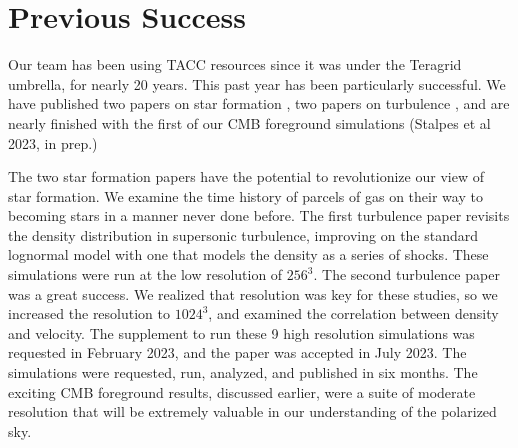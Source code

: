 \section{Previous Success}
\label{sec.previous}

Our team has been using TACC resources since it was under the Teragrid umbrella,
for nearly 20 years.
This past year has been particularly successful.  We have published two papers
on star formation \citep{Collins23, Collins23b}, two papers on turbulence
\citep{Rabatin23, Rabatin23b}, and are nearly finished with the first
of our CMB foreground simulations (Stalpes et al 2023, in prep.)

The two star formation papers have the potential to revolutionize our view of
star formation. We examine the time history of parcels of gas on their way to
becoming stars in a manner never done before.  The first turbulence paper
revisits the density distribution in supersonic turbulence, improving on the
standard lognormal model with one that models the density as a series of shocks.
These simulations were run at the low resolution of $256^3$.
The second turbulence paper was a great success.  We realized that resolution
was key for these studies, so we increased the resolution to $1024^3$, and
examined the correlation between density and velocity.  The supplement to run
these 9 high resolution simulations was requested in February 2023, and the
paper was accepted in July 2023.  The simulations were requested, run, analyzed, and
published in six months.  The exciting CMB foreground results,
discussed earlier, were a suite of moderate resolution that will be extremely
valuable in our understanding of the polarized sky.
